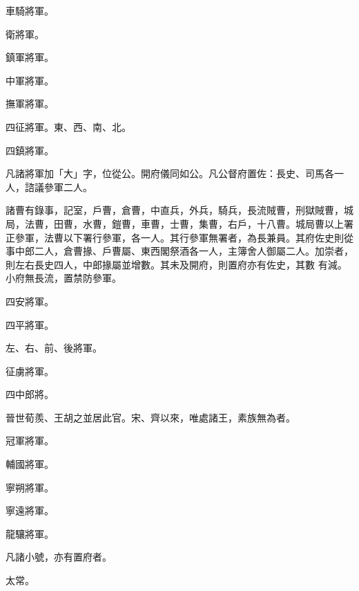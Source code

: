 \begin{pinyinscope}
 車騎將軍。



 衛將軍。



 鎮軍將軍。



 中軍將軍。



 撫軍將軍。



 四征將軍。東、西、南、北。



 四鎮將軍。



 凡諸將軍加「大」字，位從公。開府儀同如公。凡公督府置佐：長史、司馬各一人，諮議參軍二人。



 諸曹有錄事，記室，戶曹，倉曹，中直兵，外兵，騎兵，長流賊曹，刑獄賊曹，城局，法曹，田曹，水曹，鎧曹，車曹，士曹，集曹，右戶，十八曹。城局曹以上署正參軍，法曹以下署行參軍，各一人。其行參軍無署者，為長兼員。其府佐史則從事中郎二人，倉曹掾、戶曹屬、東西閣祭酒各一人，主簿舍人御屬二人。加崇者，則左右長史四人，中郎掾屬並增數。其未及開府，則置府亦有佐史，其數
 有減。小府無長流，置禁防參軍。



 四安將軍。



 四平將軍。



 左、右、前、後將軍。



 征虜將軍。



 四中郎將。



 晉世荀羨、王胡之並居此官。宋、齊以來，唯處諸王，素族無為者。



 冠軍將軍。



 輔國將軍。



 寧朔將軍。



 寧遠將軍。



 龍驤將軍。



 凡諸小號，亦有置府者。



 太常。




\end{pinyinscope}
